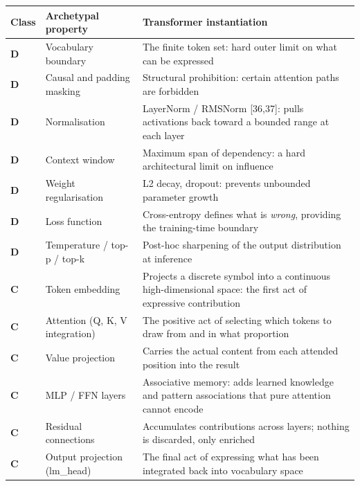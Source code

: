 \documentclass[
  11pt,
  letterpaper,
]{article}
\begin{document}
\begin{longtable}[]{@{}
  >{\raggedright\arraybackslash}p{}
  >{\raggedright\arraybackslash}p{}
  >{\raggedright\arraybackslash}p{}@{}}
\toprule\noalign{}
\begin{minipage}[b]{\linewidth}\raggedright
Class
\end{minipage} & \begin{minipage}[b]{\linewidth}\raggedright
Archetypal property
\end{minipage} & \begin{minipage}[b]{\linewidth}\raggedright
Transformer instantiation
\end{minipage} \\
\midrule\noalign{}
\endhead
\bottomrule\noalign{}
\endlastfoot
\textbf{D} & Vocabulary boundary & The finite token set: hard outer
limit on what can be expressed \\
\textbf{D} & Causal and padding masking & Structural prohibition:
certain attention paths are forbidden \\
\textbf{D} & Normalisation & LayerNorm / RMSNorm {[}36,37{]}: pulls
activations back toward a bounded range at each layer \\
\textbf{D} & Context window & Maximum span of dependency: a hard
architectural limit on influence \\
\textbf{D} & Weight regularisation & L2 decay, dropout: prevents
unbounded parameter growth \\
\textbf{D} & Loss function & Cross-entropy defines what is \emph{wrong},
providing the training-time boundary \\
\textbf{D} & Temperature / top-p / top-k & Post-hoc sharpening of the
output distribution at inference \\
\textbf{C} & Token embedding & Projects a discrete symbol into a
continuous high-dimensional space: the first act of expressive
contribution \\
\textbf{C} & Attention (Q, K, V integration) & The positive act of
selecting which tokens to draw from and in what proportion \\
\textbf{C} & Value projection & Carries the actual content from each
attended position into the result \\
\textbf{C} & MLP / FFN layers & Associative memory: adds learned
knowledge and pattern associations that pure attention cannot encode \\
\textbf{C} & Residual connections & Accumulates contributions across
layers; nothing is discarded, only enriched \\
\textbf{C} & Output projection (lm\_head) & The final act of expressing
what has been integrated back into vocabulary space \\
\end{longtable}
\end{document}

